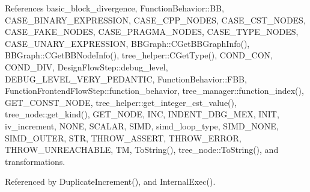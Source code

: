 References basic\+\_\+block\+\_\+divergence, Function\+Behavior\+::\+BB, C\+A\+S\+E\+\_\+\+B\+I\+N\+A\+R\+Y\+\_\+\+E\+X\+P\+R\+E\+S\+S\+I\+ON, C\+A\+S\+E\+\_\+\+C\+P\+P\+\_\+\+N\+O\+D\+ES, C\+A\+S\+E\+\_\+\+C\+S\+T\+\_\+\+N\+O\+D\+ES, C\+A\+S\+E\+\_\+\+F\+A\+K\+E\+\_\+\+N\+O\+D\+ES, C\+A\+S\+E\+\_\+\+P\+R\+A\+G\+M\+A\+\_\+\+N\+O\+D\+ES, C\+A\+S\+E\+\_\+\+T\+Y\+P\+E\+\_\+\+N\+O\+D\+ES, C\+A\+S\+E\+\_\+\+U\+N\+A\+R\+Y\+\_\+\+E\+X\+P\+R\+E\+S\+S\+I\+ON, B\+B\+Graph\+::\+C\+Get\+B\+B\+Graph\+Info(), B\+B\+Graph\+::\+C\+Get\+B\+B\+Node\+Info(), tree\+\_\+helper\+::\+C\+Get\+Type(), C\+O\+N\+D\+\_\+\+C\+ON, C\+O\+N\+D\+\_\+\+D\+IV, Design\+Flow\+Step\+::debug\+\_\+level, D\+E\+B\+U\+G\+\_\+\+L\+E\+V\+E\+L\+\_\+\+V\+E\+R\+Y\+\_\+\+P\+E\+D\+A\+N\+T\+IC, Function\+Behavior\+::\+F\+BB, Function\+Frontend\+Flow\+Step\+::function\+\_\+behavior, tree\+\_\+manager\+::function\+\_\+index(), G\+E\+T\+\_\+\+C\+O\+N\+S\+T\+\_\+\+N\+O\+DE, tree\+\_\+helper\+::get\+\_\+integer\+\_\+cst\+\_\+value(), tree\+\_\+node\+::get\+\_\+kind(), G\+E\+T\+\_\+\+N\+O\+DE, I\+NC, I\+N\+D\+E\+N\+T\+\_\+\+D\+B\+G\+\_\+\+M\+EX, I\+N\+IT, iv\+\_\+increment, N\+O\+NE, S\+C\+A\+L\+AR, S\+I\+MD, simd\+\_\+loop\+\_\+type, S\+I\+M\+D\+\_\+\+N\+O\+NE, S\+I\+M\+D\+\_\+\+O\+U\+T\+ER, S\+TR, T\+H\+R\+O\+W\+\_\+\+A\+S\+S\+E\+RT, T\+H\+R\+O\+W\+\_\+\+E\+R\+R\+OR, T\+H\+R\+O\+W\+\_\+\+U\+N\+R\+E\+A\+C\+H\+A\+B\+LE, TM, To\+String(), tree\+\_\+node\+::\+To\+String(), and transformations.



Referenced by Duplicate\+Increment(), and Internal\+Exec().

